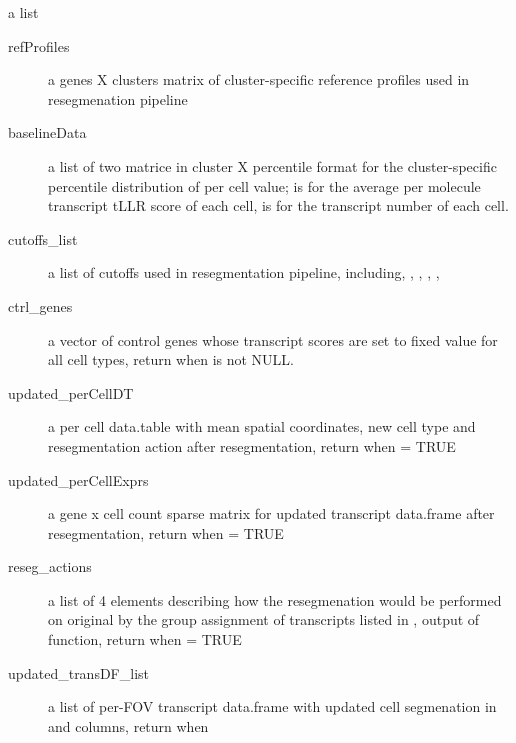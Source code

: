 \documentclass[letterpaper]{book}
\begin{document}
%
\begin{Value}
a list
\begin{description}

\item[refProfiles] a genes X clusters matrix of cluster-specific reference profiles used in resegmenation pipeline
\item[baselineData] a list of two matrice in cluster X percentile format for the cluster-specific percentile distribution of per cell value;  is for the average per molecule transcript tLLR score of each cell,  is for the transcript number of each cell.
\item[cutoffs\_list] a list of cutoffs used in resegmentation pipeline, including, , , , , 
\item[ctrl\_genes] a vector of control genes whose transcript scores are set to fixed value for all cell types, return when  is not NULL.
\item[updated\_perCellDT] a per cell data.table with mean spatial coordinates, new cell type and resegmentation action after resegmentation, return when  = TRUE
\item[updated\_perCellExprs] a gene x cell count sparse matrix for updated transcript data.frame after resegmentation, return when  = TRUE
\item[reseg\_actions] a list of 4 elements describing how the resegmenation would be performed on original  by the group assignment of transcripts listed in , output of  function, return when  = TRUE
\item[updated\_transDF\_list] a list of per-FOV transcript data.frame with updated cell segmenation in  and  columns, return when 

\end{description}

\end{Value}
%
\end{document}

